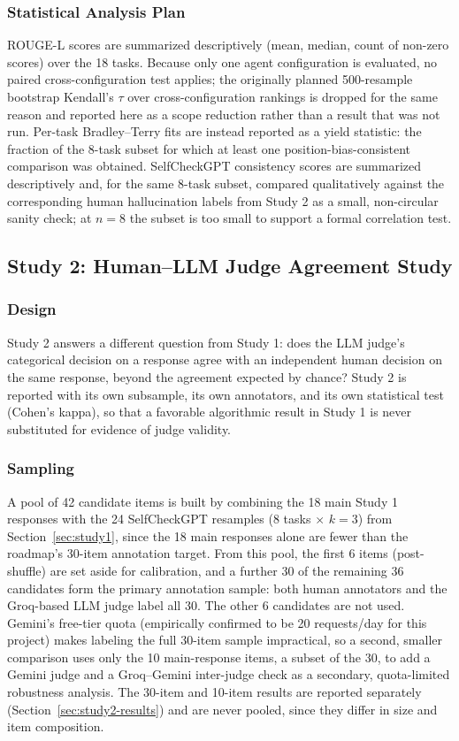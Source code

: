 \documentclass[conference]{IEEEtran}
\begin{document}
\subsubsection{Statistical Analysis Plan}
ROUGE-L scores are summarized descriptively (mean, median, count of non-zero scores) over the 18 tasks. Because only one agent configuration is evaluated, no paired cross-configuration test applies; the originally planned 500-resample bootstrap Kendall's $\tau$ over cross-configuration rankings is dropped for the same reason and reported here as a scope reduction rather than a result that was not run. Per-task Bradley--Terry fits are instead reported as a yield statistic: the fraction of the 8-task subset for which at least one position-bias-consistent comparison was obtained. SelfCheckGPT consistency scores are summarized descriptively and, for the same 8-task subset, compared qualitatively against the corresponding human hallucination labels from Study 2 as a small, non-circular sanity check; at $n=8$ the subset is too small to support a formal correlation test.

\subsection{Study 2: Human--LLM Judge Agreement Study}
\label{sec:study2}
\subsubsection{Design}
Study 2 answers a different question from Study 1: does the LLM judge's categorical decision on a response agree with an independent human decision on the same response, beyond the agreement expected by chance? Study 2 is reported with its own subsample, its own annotators, and its own statistical test (Cohen's kappa), so that a favorable algorithmic result in Study 1 is never substituted for evidence of judge validity.

\subsubsection{Sampling}
A pool of 42 candidate items is built by combining the 18 main Study 1 responses with the 24 SelfCheckGPT resamples ($8$ tasks $\times$ $k=3$) from Section~\ref{sec:study1}, since the 18 main responses alone are fewer than the roadmap's 30-item annotation target. From this pool, the first 6 items (post-shuffle) are set aside for calibration, and a further 30 of the remaining 36 candidates form the primary annotation sample: both human annotators and the Groq-based LLM judge label all 30. The other 6 candidates are not used. Gemini's free-tier quota (empirically confirmed to be 20 requests/day for this project) makes labeling the full 30-item sample impractical, so a second, smaller comparison uses only the 10 main-response items, a subset of the 30, to add a Gemini judge and a Groq--Gemini inter-judge check as a secondary, quota-limited robustness analysis. The 30-item and 10-item results are reported separately (Section~\ref{sec:study2-results}) and are never pooled, since they differ in size and item composition.
\end{document}
